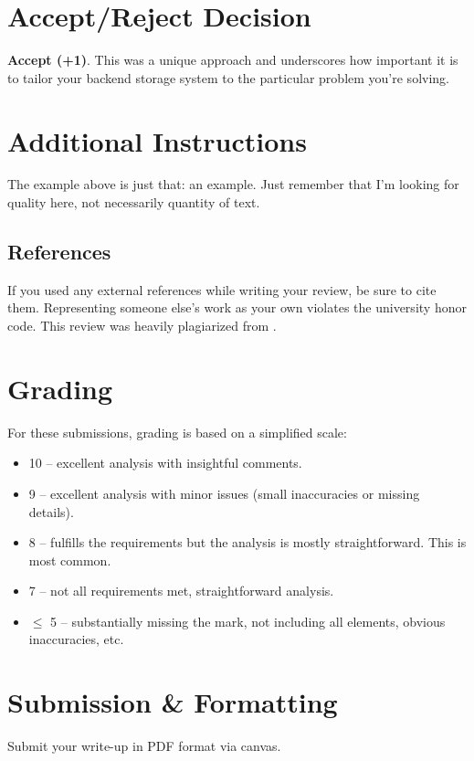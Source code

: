\documentclass[notitlepage,12pt]{article}
\begin{document}
\section{Accept/Reject Decision}
\textbf{Accept (+1)}. This was a unique approach and underscores how important it is to tailor your backend storage system to the particular problem you're solving.

\pagebreak

\section{Additional Instructions}
The example above is just that: an example. Just remember that I'm looking for quality here, not necessarily quantity of text.

\subsection{References}
If you used any external references while writing your review, be sure to cite them. Representing someone else's work as your own violates the university honor code. This review was heavily plagiarized from \cite{bigdata}.

\section{Grading}
For these submissions, grading is based on a simplified scale:
\begin{itemize}
\item 10 -- excellent analysis with insightful comments.
\item 9 -- excellent analysis with minor issues (small inaccuracies or missing details).
\item 8 -- fulfills the requirements but the analysis is mostly straightforward. This is most common.
\item 7 -- not all requirements met, straightforward analysis.
\item $\leq$ 5 -- substantially missing the mark, not including all elements, obvious inaccuracies, etc.
\end{itemize}

\section{Submission \& Formatting}
Submit your write-up in PDF format via canvas. \vspace{1em} %
\end{document}

